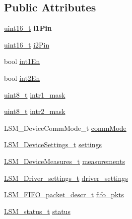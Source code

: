 \subsection*{Public Attributes}
\begin{DoxyCompactItemize}
\item 
\mbox{\label{structLSM__DriverSettings_abe7b9a8eb65e5c787bb575c20eb632fb}} 
\hyperlink{vl53l0x__types_8h_a273cf69d639a59973b6019625df33e30}{uint16\+\_\+t} {\bfseries i1\+Pin}
\item 
\hyperlink{vl53l0x__types_8h_a273cf69d639a59973b6019625df33e30}{uint16\+\_\+t} \hyperlink{structLSM__DriverSettings_ac5e7d16098a2edade5754f2eba5d4b6e}{i2\+Pin}
\item 
bool \hyperlink{structLSM__DriverSettings_a1909b0fde3f2597bfff85f710155fa5a}{int1\+En}
\item 
bool \hyperlink{structLSM__DriverSettings_aeb418668f399649751cd76daf50e9f5b}{int2\+En}
\item 
\hyperlink{vl53l0x__types_8h_aba7bc1797add20fe3efdf37ced1182c5}{uint8\+\_\+t} \hyperlink{structLSM__DriverSettings_a70745c29bbb1a152fd864788bf442d90}{intr1\+\_\+mask}
\item 
\hyperlink{vl53l0x__types_8h_aba7bc1797add20fe3efdf37ced1182c5}{uint8\+\_\+t} \hyperlink{structLSM__DriverSettings_a1e63a45c4aa7308f24ae90cb12027383}{intr2\+\_\+mask}
\item 
L\+S\+M\+\_\+\+Device\+Comm\+Mode\+\_\+t \hyperlink{structLSM__DriverSettings_a2931e2571bc690535ac6d2c1730f52d6}{comm\+Mode}
\item 
\hyperlink{structLSM__deviceSettings}{L\+S\+M\+\_\+\+Device\+Settings\+\_\+t} \hyperlink{structLSM__DriverSettings_aa13696d3b69d61affa5f8ece697da108}{settings}
\item 
\hyperlink{structLSM__DeviceMeasures}{L\+S\+M\+\_\+\+Device\+Measures\+\_\+t} \hyperlink{structLSM__DriverSettings_a17dd42c3eba587838df128376bfa834f}{measurements}
\item 
\hyperlink{structLSM__Driver__settings}{L\+S\+M\+\_\+\+Driver\+\_\+settings\+\_\+t} \hyperlink{structLSM__DriverSettings_a27fddf0bb2b33710460e4df455461054}{driver\+\_\+settings}
\item 
\hyperlink{structLSM__FIFO__packet__descr__t}{L\+S\+M\+\_\+\+F\+I\+F\+O\+\_\+packet\+\_\+descr\+\_\+t} \hyperlink{structLSM__DriverSettings_a3f5bf280c1d267d58e45bd8ac2d06040}{fifo\+\_\+pkts}
\item 
\hyperlink{structLSM__status}{L\+S\+M\+\_\+status\+\_\+t} \hyperlink{structLSM__DriverSettings_a75f33ebc368b5b1f3b0651cb16f4105c}{status}

\end{DoxyCompactItemize}

